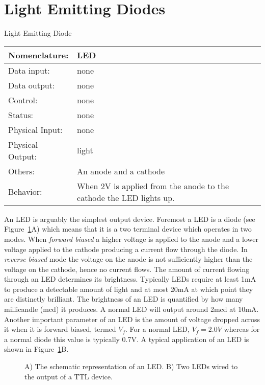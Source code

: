 \section{Light Emitting Diodes}
\label{page:led}
\begin{buildingblock}{Light Emitting Diode}
\begin{tabular}{|l|p{3.5in}|} \hline
Nomenclature: & LED \\ \hline
Data input:    & none     \\ \hline
Data output:   & none    \\ \hline
Control:       & none        \\ \hline
Status:        & none                                   \\ \hline
Physical Input:& none		\\ \hline
Physical Output:& light		\\ \hline
Others:        & An anode and a cathode                 \\ \hline
Behavior:      & When 2V is applied from the anode to the cathode the LED lights up. \\ \hline
\end{tabular}
\end{buildingblock}

An LED is arguably the simplest output device.  Foremost a LED
is a diode (see Figure~\ref{fig:commonPeripheralComponentsled}A) which means that it is a 
two terminal device which operates
in two modes.  When \textit{ forward biased} a higher voltage is applied
to the anode and a lower voltage applied to the cathode producing a 
current flow through the diode.  In \textit{ reverse biased} mode the voltage
on the anode is not sufficiently higher than the voltage on the cathode,
hence no current flows.   The amount of current flowing through an LED
determines its brightness.
Typically LEDs require at least 1mA to produce a detectable
amount of light and at most 20mA at which point they are 
distinctly brilliant.  The brightness of an LED is 
quantified by how many millicandle (mcd) it produces.  A normal LED will
output around 2mcd at 10mA.  Another important parameter of an LED is the 
amount of voltage dropped across it when it is forward biased, termed $V_f$.
For a normal LED, $V_f=2.0V$ whereas for a normal diode this value is 
typically 0.7V.  A typical application of an LED is shown in 
Figure~\ref{fig:commonPeripheralComponentsled}B.

\begin{figure}[ht]
\caption{A) The schematic representation of an LED.  B) Two LEDs wired
to the output of a TTL device.}
\label{fig:commonPeripheralComponentsled}
\end{figure}

